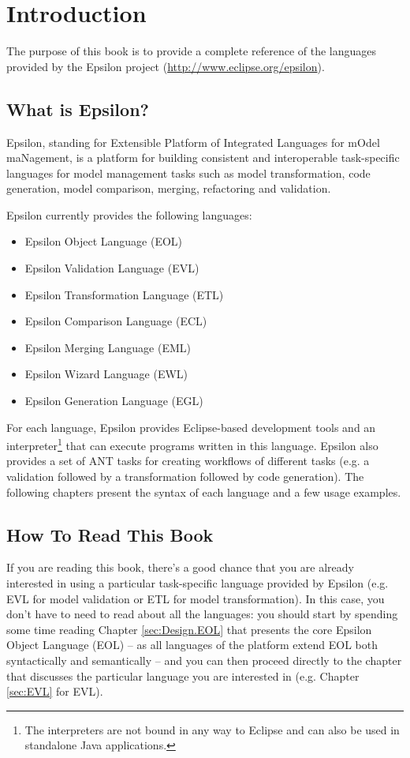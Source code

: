 \chapter{Introduction}
\label{chp:Introduction}

The purpose of this book is to provide a complete reference of the languages provided by the Epsilon project (\url{http://www.eclipse.org/epsilon}).

\section{What is Epsilon?}

Epsilon, standing for Extensible Platform of Integrated Languages for mOdel maNagement, is a platform for building consistent and interoperable task-specific languages for model management tasks such as model transformation, code generation, model comparison, merging, refactoring and validation.

Epsilon currently provides the following languages:

\begin{itemize}
	\item Epsilon Object Language (EOL)
	\item Epsilon Validation Language (EVL)
	\item Epsilon Transformation Language (ETL)
	\item Epsilon Comparison Language (ECL)
	\item Epsilon Merging Language (EML)
	\item Epsilon Wizard Language (EWL)
	\item Epsilon Generation Language (EGL)
\end{itemize}

For each language, Epsilon provides Eclipse-based development tools and an interpreter\footnote{The interpreters are not bound in any way to Eclipse and can also be used in standalone Java applications.} that can execute programs written in this language. Epsilon also provides a set of ANT tasks for creating workflows of different tasks (e.g. a validation followed by a transformation followed by code generation). The following chapters present the syntax of each language and a few usage examples.

\section{How To Read This Book}

If you are reading this book, there's a good chance that you are already interested in using a particular task-specific language provided by Epsilon (e.g. EVL for model validation or ETL for model transformation). In this case, you don't have to need to read about all the languages: you should start by spending some time reading Chapter \ref{sec:Design.EOL} that presents the core Epsilon Object Language (EOL) -- as all languages of the platform extend EOL both syntactically and semantically -- and you can then proceed directly to the chapter that discusses the particular language you are interested in (e.g. Chapter \ref{sec:EVL} for EVL).

